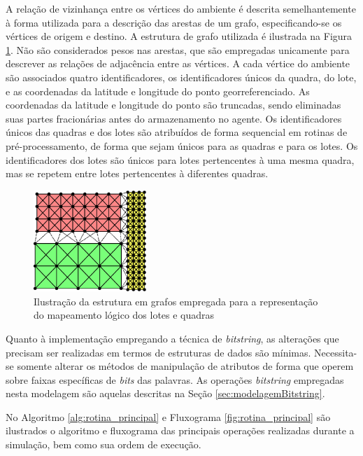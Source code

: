 A relação de vizinhança entre os vértices do ambiente é descrita semelhantemente à forma utilizada para a descrição das arestas de um grafo, especificando-se os vértices de origem e destino. A estrutura de grafo utilizada é ilustrada na Figura \ref{fig:grafo}. Não são considerados pesos nas arestas, que são empregadas unicamente para descrever as relações de adjacência entre as vértices. A cada vértice do ambiente são associados quatro identificadores, os identificadores únicos da quadra, do lote, e as coordenadas da latitude e longitude do ponto georreferenciado. As coordenadas da latitude e longitude do ponto são truncadas, sendo eliminadas suas partes fracionárias antes do armazenamento no agente. Os identificadores únicos das quadras e dos lotes são atribuídos de forma sequencial em rotinas de pré-processamento, de forma que sejam únicos para as quadras e para os lotes. Os identificadores dos lotes são únicos para lotes pertencentes à uma mesma quadra, mas se repetem entre lotes pertencentes à diferentes quadras.

\begin{figure}[H]
  \centering
  \includegraphics[width=0.38\textwidth]{Figuras/EstruturasDadosEstrategias/grafo.eps}
  \caption{Ilustração da estrutura em grafos empregada para a representação do mapeamento lógico dos lotes e quadras}
  \label{fig:grafo}
\end{figure} 

Quanto à implementação empregando a técnica de \textit{bitstring}, as alterações que precisam ser realizadas em termos de estruturas de dados são mínimas. Necessita-se somente alterar os métodos de manipulação de atributos de forma que operem sobre faixas específicas de \textit{bits} das palavras. As operações \textit{bitstring} empregadas nesta modelagem são aquelas descritas na Seção \ref{sec:modelagemBitstring}.

No Algoritmo \ref{alg:rotina_principal} e Fluxograma \ref{fig:rotina_principal} são ilustrados o algoritmo e fluxograma das principais operações realizadas durante a simulação, bem como sua ordem de execução. 

